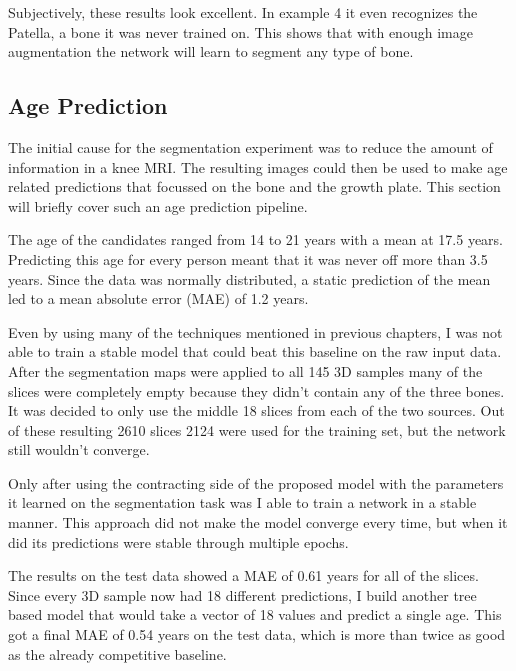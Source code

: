 Subjectively, these results look excellent. In example 4 it even recognizes the Patella, a bone it was never trained on. This shows that with enough image augmentation the network will learn to segment any type of bone.

\subsection{Age Prediction}

The initial cause for the segmentation experiment was to reduce the amount of information in a knee MRI. The resulting images could then be used to make age related predictions that focussed on the bone and the growth plate. This section will briefly cover such an age prediction pipeline.

The age of the candidates ranged from 14 to 21 years with a mean at 17.5 years. Predicting this age for every person meant that it was never off more than 3.5 years. Since the data was normally distributed, a static prediction of the mean led to a mean absolute error (MAE) of 1.2 years.

Even by using many of the techniques mentioned in previous chapters, I was not able to train a stable model that could beat this baseline on the raw input data. After the segmentation maps were applied to all 145 3D samples many of the slices were completely empty because they didn't contain any of the three bones. It was decided to only use the middle 18 slices from each of the two sources. Out of these resulting 2610 slices 2124 were used for the training set, but the network still wouldn't converge.

Only after using the contracting side of the proposed model with the parameters it learned on the segmentation task was I able to train a network in a stable manner. This approach did not make the model converge every time, but when it did its predictions were stable through multiple epochs. 

The results on the test data showed a MAE of 0.61 years for all of the slices. Since every 3D sample now had 18 different predictions, I build another tree based model that would take a vector of 18 values and predict a single age. This got a final MAE of 0.54 years on the test data, which is more than twice as good as the already competitive baseline.

\newpage